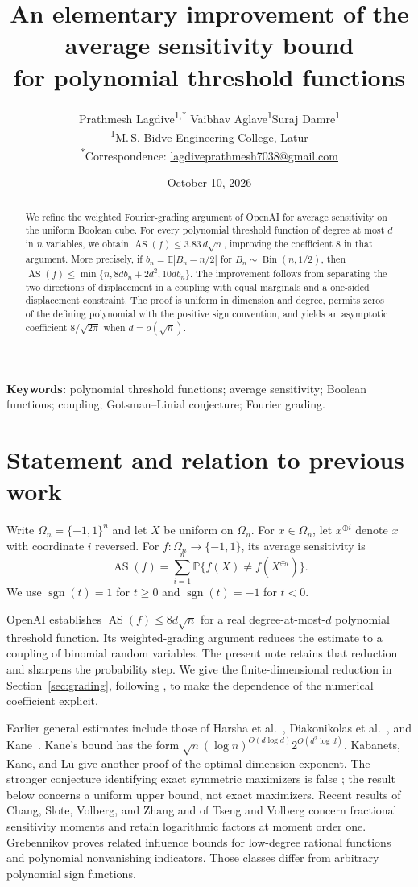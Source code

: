 \documentclass[11pt]{article}
\title{An elementary improvement of the average sensitivity bound\texorpdfstring{\\}{ }for polynomial threshold functions}
\author{Prathmesh Lagdive\textsuperscript{1,*}\quad
Vaibhav Aglave\textsuperscript{1}\quad Suraj Damre\textsuperscript{1}\\[0.4em]
\small\textsuperscript{1}M.\,S. Bidve Engineering College, Latur\\[0.3em]
\small\textsuperscript{*}Correspondence:
\href{mailto:lagdiveprathmesh7038@gmail.com}{lagdiveprathmesh7038@gmail.com}}
\date{October 10, 2026}
\theoremstyle{remark}
\newcommand{\E}{\mathbb E}
\newcommand{\Prob}{\mathbb P}
\newcommand{\AS}{\operatorname{AS}}
\newcommand{\sgn}{\operatorname{sgn}}
\begin{document}
\maketitle
\begin{abstract}
We refine the weighted Fourier-grading argument of OpenAI for average
sensitivity on the uniform Boolean cube. For every polynomial threshold
function of degree at most $d$ in $n$ variables, we obtain
$\AS(f)\le 3.83\,d\sqrt n$, improving the coefficient $8$ in that argument.
More precisely, if $b_n=\E|B_n-n/2|$ for
$B_n\sim\operatorname{Bin}(n,1/2)$, then
$\AS(f)\le\min\{n,8d b_n+2d^2,10d b_n\}$.
The improvement follows from separating the two directions of displacement
in a coupling with equal marginals and a one-sided displacement constraint.
The proof is uniform in dimension and degree, permits zeros of the defining
polynomial with the positive sign convention, and yields an asymptotic
coefficient $8/\sqrt{2\pi}$ when $d=o(\sqrt n)$.
\end{abstract}

\noindent\textbf{Keywords:} polynomial threshold functions; average sensitivity;
Boolean functions; coupling; Gotsman--Linial conjecture; Fourier grading.
\medskip

\section{Statement and relation to previous work}
Write $\Omega_n=\{-1,1\}^n$ and let $X$ be uniform on $\Omega_n$.
For $x\in\Omega_n$, let $x^{\oplus i}$ denote $x$ with coordinate $i$ reversed.
For $f:\Omega_n\to\{-1,1\}$, its average sensitivity is
\begin{equation}\label{eq:as}
 \AS(f)=\sum_{i=1}^n\Prob\{f(X)\ne f(X^{\oplus i})\}.
\end{equation}
We use $\sgn(t)=1$ for $t\ge0$ and $\sgn(t)=-1$ for $t<0$.

OpenAI \cite{OpenAI} establishes $\AS(f)\le8d\sqrt n$ for a real
degree-at-most-$d$ polynomial threshold function. Its weighted-grading
argument reduces the estimate to a coupling of binomial random variables.
The present note retains that reduction and sharpens the probability step.
We give the finite-dimensional reduction in Section~\ref{sec:grading},
following \cite[Lemma 3 and Section 5]{OpenAI}, to make the dependence of
the numerical coefficient explicit.

Earlier general estimates include those of Harsha et al.~\cite{HKM},
Diakonikolas et al.~\cite{DRST}, and Kane~\cite{Kane}.
Kane's bound has the form
$\sqrt n(\log n)^{O(d\log d)}2^{O(d^2\log d)}$.
Kabanets, Kane, and Lu \cite{KKL} give another proof of the optimal
dimension exponent. The stronger conjecture identifying exact symmetric
maximizers is false \cite{Chapman,KMW}; the result below concerns a
uniform upper bound, not exact maximizers.
Recent results of Chang, Slote, Volberg, and Zhang \cite{CSVZ} and of
Tseng and Volberg \cite{TV} concern fractional sensitivity moments and
retain logarithmic factors at moment order one.
Grebennikov \cite{Grebennikov} proves related influence bounds for
low-degree rational functions and polynomial nonvanishing indicators.
Those classes differ from arbitrary polynomial sign functions.
\end{document}
